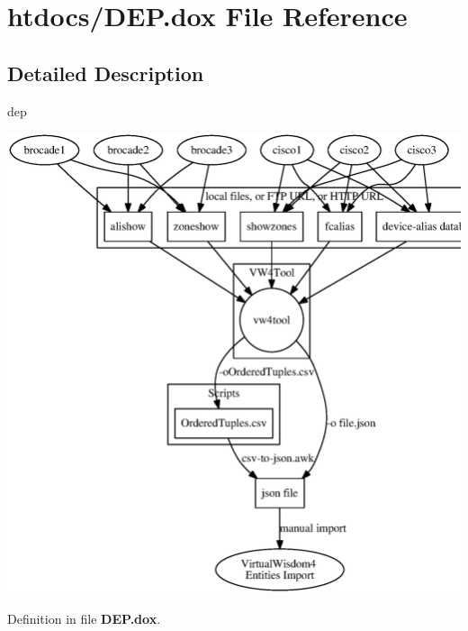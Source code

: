 \section{htdocs/\+D\+E\+P.dox File Reference}
\label{DEP_8dox}


\subsection{Detailed Description}
dep \begin{center}

\begin{DoxyImageNoCaption}
  \mbox{\includegraphics[width=\textwidth,height=\textheight/2,keepaspectratio=true]{dot_inline_dotgraph_1}}
\end{DoxyImageNoCaption}
\end{center}
 

Definition in file {\bf D\+E\+P.\+dox}.

